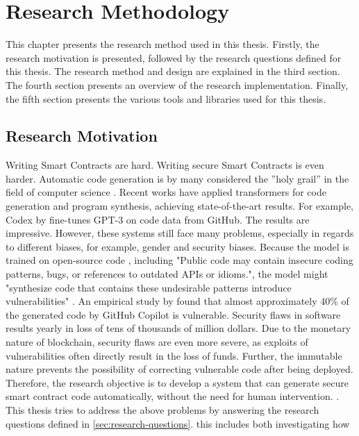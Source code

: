 \chapter{Research Methodology}
\label{chap:method}
This chapter presents the research method used in this thesis. Firstly, the research motivation is presented, followed by the research questions defined for this thesis. The research method and design are explained in the third section. The fourth section presents an overview of the research implementation. Finally, the fifth section presents the various tools and libraries used for this thesis.

\section{Research Motivation}
\label{sec:research-motivation}
Writing Smart Contracts are hard. Writing secure Smart Contracts is even harder. Automatic code generation is by many considered the ”holy grail” in the field of computer science \cite{PGL-010}. Recent works have applied transformers for code generation and program synthesis, achieving state-of-the-art results. For example, Codex by \cite{chen2021codex} fine-tunes GPT-3 \cite{brown2020language} on code data from GitHub. The results are impressive. However, these systems still face many problems, especially in regards to different biases, for example, gender and security biases. Because the model is trained on open-source code \cite{chen2021codex}, including "Public code may contain insecure coding patterns, bugs, or references to outdated APIs or idioms.", the model might "synthesize code that contains these undesirable patterns introduce vulnerabilities" \cite{copilot}. An empirical study by \textcite{pearce2021asleep} found that almost approximately 40\% of the generated code by GitHub Copilot is vulnerable. Security flaws in software results yearly in loss of tens of thousands of million dollars. Due to the monetary nature of blockchain, security flaws are even more severe, as exploits of vulnerabilities often directly result in the loss of funds. Further, the immutable nature prevents the possibility of correcting vulnerable code after being deployed. Therefore, the research objective is to develop a system that can generate secure smart contract code automatically, without the need for human intervention. . This thesis tries to address the above problems by answering the research questions defined in \cref{sec:research-questions}. this includes both investigating how 


